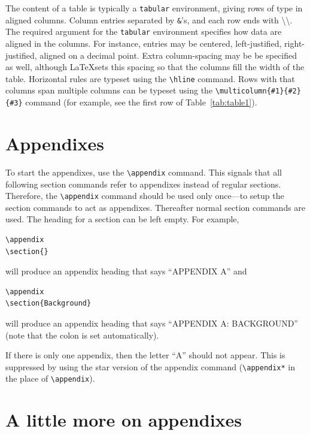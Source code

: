 \documentclass[]{article}
\begin{document}
The content of a table is typically a \texttt{tabular} environment, 
giving rows of type in aligned columns. 
Column entries separated by \verb+&+'s, and 
each row ends with \textbackslash\textbackslash. 
The required argument for the \texttt{tabular} environment
specifies how data are aligned in the columns. 
For instance, entries may be centered, left-justified, right-justified, aligned on a decimal
point. 
Extra column-spacing may be be specified as well, 
although \LaTeX sets this spacing so that the columns fill the width of the
table. Horizontal rules are typeset using the \verb+\hline+
command. Rows with that columns span multiple columns can be typeset using the
\verb+\multicolumn{#1}{#2}{#3}+ command (for example, see the first
row of Table~\ref{tab:table1}).%

\appendix

\section{Appendixes}

To start the appendixes, use the \verb+\appendix+ command.
This signals that all following section commands refer to appendixes
instead of regular sections. Therefore, the \verb+\appendix+ command
should be used only once---to setup the section commands to act as
appendixes. Thereafter normal section commands are used. The heading
for a section can be left empty. For example,
\begin{verbatim}
\appendix
\section{}
\end{verbatim}
will produce an appendix heading that says ``APPENDIX A'' and
\begin{verbatim}
\appendix
\section{Background}
\end{verbatim}
will produce an appendix heading that says ``APPENDIX A: BACKGROUND''
(note that the colon is set automatically).

If there is only one appendix, then the letter ``A'' should not
appear. This is suppressed by using the star version of the appendix
command (\verb+\appendix*+ in the place of \verb+\appendix+).

\section{A little more on appendixes}
\end{document}
